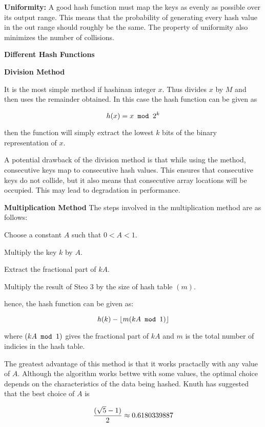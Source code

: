 \vskip 3mm
{\bf Uniformity:} A good hash function must map the keys as evenly as possible over its output range. This means that the probability of generating every hash value in the out range should roughly be the same. The property of uniformity also minimizes the number of collisions.

\filbreak
\vskip 1cm
{\bf Different Hash Functions}

\vskip 1mm
{\bf Division Method}

\vskip 1mm
It is the most simple method if hashinan integer $x$. Thus divides $x$ by $M$ and then uses the remainder obtained. In this case the hash function can be given as

$$h(x)=x\hbox{\tt{} mod }2^k$$

then the function will simply extract the lowest $k$ bits of the binary representation of $x$.

\vskip 1mm
A potential drawback of the division method is that while using the method, consecutive keys map to consecutive hash values. This ensures that consecutive keys do not collide, but it also means that consecutive array locations will be occupied. This may lead to degradation in performance.

\vskip 3mm
{\bf Multiplication Method}
\vskip 1mm
The steps involved in the multiplication method are as follows:

\vskip 3mm
 Choose a constant $A$ such that $0<A<1$.

\vskip 3mm
 Multiply the key $k$ by $A$.

\vskip 3mm
 Extract the fractional part of $kA$.

\vskip 3mm
 Multiply the result of Steo 3 by the size of hash table $(m)$.

\vskip 1mm
hence, the hash function can be given as:

$$h(k)-\lfloor m(kA\hbox{\tt{} mod }1)\rfloor$$

where $(kA\hbox{\tt{} mod }1)$ gives the fractional part of $kA$ and $m$ is the total number of indicies in the hash table.

\vskip 1mm
The greatest advantage of this method is that it works practaclly with any value of $A$. Although the algorithm works bettwe with some values, the optimal choice depends on the characteristics of the data being hashed. Knuth has suggested that the best choice of $A$ is

$${(\sqrt{5}-1)\over 2}\approx 0.6180339887$$

